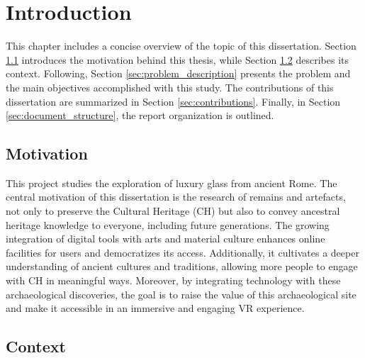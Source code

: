 
%

\chapter{Introduction}
\label{cha:introduction}

This chapter includes a concise overview of the topic of this dissertation. 
Section \ref{sec:motivation} introduces the motivation behind this thesis, while Section \ref{sec:context} describes its context.
Following, Section \ref{sec:problem_description} presents the problem and the main objectives accomplished with this study. 
The contributions of this dissertation are summarized in Section \ref{sec:contributions}.
Finally, in Section \ref{sec:document_structure}, the report organization is outlined.

\section{Motivation}
\label{sec:motivation}
This project studies the exploration of luxury glass from ancient Rome.
The central motivation of this dissertation is the research of remains and artefacts, not
only to preserve the Cultural Heritage (\gls{CH}) but also to convey ancestral heritage knowledge to everyone, including future generations. 
The growing integration of digital tools with arts and material culture enhances online 
facilities for users and democratizes its access. Additionally, it cultivates a deeper understanding of ancient cultures and traditions, allowing more people to engage with
\gls{CH} in meaningful ways. Moreover, by integrating technology with these archaeological 
discoveries, the goal is to raise the value of this archaeological site and make it accessible in an immersive and engaging \gls{VR} experience.


\section{Context}
\label{sec:context}

